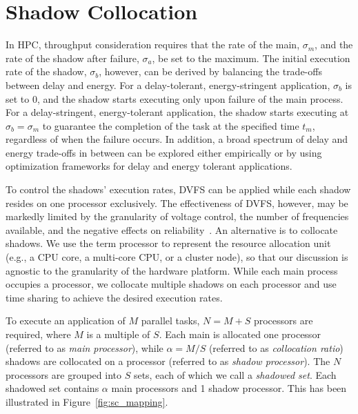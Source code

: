 \section{Shadow Collocation}
\label{sec:shadow_collocation}
In HPC, throughput consideration requires that the rate of the main, $\sigma_m$, and the rate of the shadow after failure, 
$\sigma_a$, be set to the maximum. 
The initial execution rate of the shadow, $\sigma_b$, however, can be derived by balancing the trade-offs between delay and energy.
For a delay-tolerant, energy-stringent application, $\sigma_b$ is set to 0, and the shadow starts executing only upon failure of the main process. 
For a delay-stringent, energy-tolerant application, the shadow starts executing at $\sigma_b=\sigma_m$ to guarantee the completion of the task at the specified time $t_m$, regardless of when the failure occurs.  
In addition, a broad spectrum of delay and energy trade-offs in between can be explored either empirically or by using optimization frameworks for delay and energy tolerant applications.


To control the shadows' execution rates, DVFS can be applied while each shadow resides on one processor exclusively. 
The effectiveness of DVFS, however, may be markedly 
limited by the granularity of voltage control, the number of frequencies available, and the negative effects on 
reliability~\cite{Eyerman:2011:FDU:1952998.1952999,Keller:EECS-2015-257,chandra2008defect,zhao2008reliability}. 
An alternative is to collocate shadows.
We use the term processor to represent the resource allocation unit (e.g., a CPU core, a multi-core CPU, or a cluster node), so that our discussion is agnostic to the granularity of the hardware platform. While each main process occupies a processor,  we collocate multiple shadows on each processor and use time sharing to achieve the desired execution rates.


To execute an application of $M$ parallel tasks, $N=M+S$ processors are required, where $M$ is a multiple of $S$. Each main is allocated one processor (referred to as \textit{main processor}), while $\alpha=M/S$ (referred to as \textit{collocation ratio}) shadows are collocated on a processor (referred to as \textit{shadow processor}). 
The $N$ processors are grouped into $S$ sets, each of which we call a \textit{shadowed set}. Each shadowed set contains $\alpha$ main processors and 1 shadow processor.
This has been illustrated in Figure~\ref{fig:sc_mapping}.  

